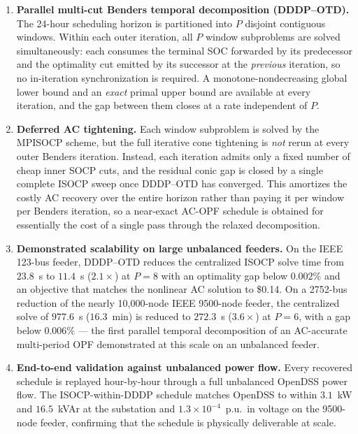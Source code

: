 \begin{enumerate}

\item \textbf{Parallel multi-cut Benders temporal decomposition (DDDP--OTD).}
The 24-hour scheduling horizon is partitioned into $P$ disjoint contiguous
windows. Within each outer iteration, all $P$ window subproblems are solved
simultaneously: each consumes the terminal SOC forwarded by its predecessor and
the optimality cut emitted by its successor at the \emph{previous} iteration,
so no in-iteration synchronization is required. A monotone-nondecreasing global
lower bound and an \emph{exact} primal upper bound are available at every
iteration, and the gap between them closes at a rate independent of $P$.

\item \textbf{Deferred AC tightening.}
Each window subproblem is solved by the MPISOCP scheme, but the full
iterative cone tightening is \emph{not} rerun at every outer Benders iteration.
Instead, each iteration admits only a fixed number of cheap inner SOCP cuts,
and the residual conic gap is closed by a single complete ISOCP sweep once
DDDP--OTD has converged. This amortizes the costly AC recovery over the entire
horizon rather than paying it per window per Benders iteration, so a near-exact
AC-OPF schedule is obtained for essentially the cost of a single pass through the
relaxed decomposition.

\item \textbf{Demonstrated scalability on large unbalanced feeders.}
On the IEEE 123-bus feeder, DDDP--OTD reduces the centralized ISOCP solve time
from $23.8$~s to $11.4$~s ($2.1\times$) at $P\!=\!8$ with an optimality gap
below $0.002\%$ and an objective that matches the nonlinear AC solution to
\$0.14. On a 2752-bus reduction of the nearly 10,000-node IEEE 9500-node feeder,
the centralized solve of $977.6$~s ($16.3$~min) is reduced to $272.3$~s
($3.6\times$) at $P\!=\!6$, with a gap below $0.006\%$ --- the first parallel
temporal decomposition of an AC-accurate multi-period OPF demonstrated at this
scale on an unbalanced feeder.

\item \textbf{End-to-end validation against unbalanced power flow.}
Every recovered schedule is replayed hour-by-hour through a full unbalanced
OpenDSS power flow. The ISOCP-within-DDDP schedule matches OpenDSS to within
$3.1$~kW and $16.5$~kVAr at the substation and $1.3\times10^{-4}$~p.u.\ in
voltage on the 9500-node feeder, confirming that the schedule is physically
deliverable at scale.

\end{enumerate}

